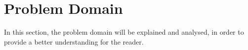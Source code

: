 \section{Problem Domain}\label{sec:problemDomain}
In this section, the problem domain will be explained and analysed, in order to provide a better understanding for the reader.
